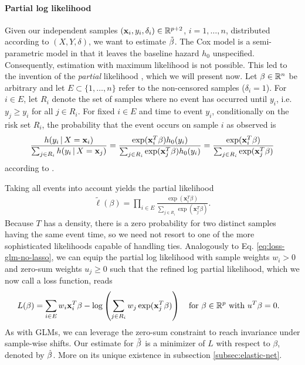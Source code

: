 \paragraph{Partial log likelihood}
Given our independent samples $(\mathbf{x}_i, y_i, \delta_i) \in \mathbb{R}^{p+2}$, $i = 1, \ldots, n$, distributed 
according to $(X, Y, \delta)$, we want to estimate $\tilde{\beta}$. The Cox model is a semi-parametric 
model in that it leaves the baseline hazard $h_0$ unspecified. Consequently, estimation with maximum 
likelihood is not possible. This led to the invention of the \textit{partial} likelihood 
\cite{cox72}, which we will present now. Let $\beta \in \mathbb{R}^n$ be arbitrary and let 
$E \subset \{ 1, \ldots, n \}$ refer to the non-censored samples ($\delta_i = 1$). For $i \in E$, 
let $R_i$ denote the set of samples 
where no event has occurred until $y_i$, i.e. $y_j \geq y_i$ for all $j \in R_i$. For
fixed $i \in E$ and time to event $y_i$, conditionally on the risk set $R_i$, the probability that 
the event occurs on sample $i$ as observed is
\begin{align}
    \frac{h(y_i \,|\, X = \mathbf{x}_i)}{\sum_{j \in R_i} h(y_i \,|\, X = \mathbf{x}_j)} = 
    \frac{\exp(\mathbf{x}_i^T \beta) h_0(y_i)}{\sum_{j \in R_i} \exp(\mathbf{x}_j^T \beta) h_0(y_i)} = 
    \frac{\exp(\mathbf{x}_i^T \beta)}{\sum_{j \in R_i} \exp(\mathbf{x}_j^T \beta)}
\end{align}
according to \cite[Eq. (12)]{cox72}.

Taking all events into account yields the partial likelihood 
\begin{align}\label{eq:cox-partial-lh}
    \tilde{\ell}(\beta) = \prod_{i \in E} \frac{\exp(\mathbf{x}_i^T \beta)}{\sum_{j \in R_i} \exp(\mathbf{x}_j^T 
    \beta)}.
\end{align}
Because $T$ has a density, there is a zero probability for two distinct samples having the same 
event time, so we need not resort to one of the more sophisticated likelihoods capable of handling ties.
Analogously to Eq. \eqref{eq:loss-glm-no-lasso}, we can equip the partial log likelihood with sample 
weights $w_i > 0$ and zero-sum weights $u_j \geq 0$ such that the refined log partial likelihood, 
which we now call a loss function, reads 
\begin{align}\label{eq:cox-loss}
\begin{split}
    L(\beta) &= \sum_{i \in E} w_i \mathbf{x}_i^T \beta - \log \left( \sum_{j \in R_i} w_j \exp(\mathbf{x}_j^T
    \beta) \right) \quad \text{for } \beta \in \mathbb{R}^p \text{ with } u^T \beta = 0.
\end{split}
\end{align}
As with GLMs, we can leverage the zero-sum constraint to reach invariance under sample-wise shifts. 
Our estimate for $\tilde{\beta}$ is a minimizer of $L$ with respect to $\beta$, denoted by $\hat{\beta}$. 
More on its unique existence in subsection \ref{subsec:elastic-net}.

